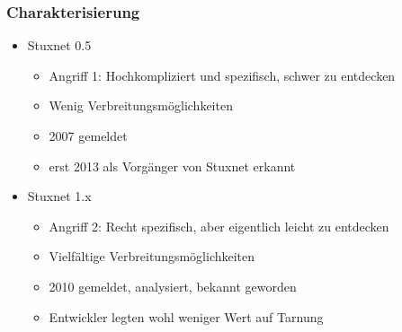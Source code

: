\documentclass{beamer}
\begin{document}
\begin{frame}
  \frametitle{Charakterisierung}
  \begin{itemize}
    \item Stuxnet 0.5
      \begin{itemize}
        \item Angriff 1: Hochkompliziert und spezifisch, schwer zu entdecken
        \item Wenig Verbreitungsmöglichkeiten
        \item 2007 gemeldet
        \item erst 2013 als Vorgänger von Stuxnet erkannt
      \end{itemize}
    \item Stuxnet 1.x
      \begin{itemize}
        \item Angriff 2: Recht spezifisch, aber eigentlich leicht zu entdecken
        \item Vielfältige Verbreitungsmöglichkeiten
        \item 2010 gemeldet, analysiert, bekannt geworden
        \item Entwickler legten wohl weniger Wert auf Tarnung
      \end{itemize}
  \end{itemize}
\end{frame}
\end{document}
